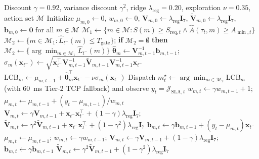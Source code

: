 \documentclass[10pt,journal,compsoc]{IEEEtran}
\begin{document}
\begin{algorithm}[!t]
\caption{CAPQ-Pareto Mean-Centered Russac D-LinUCB with Three-Tier Bounded SLA Gate}
\label{alg:bandit}
\begin{algorithmic}[1]
\Require Discount $\gamma=0.92$, variance discount $\gamma^2$, ridge $\lambda_{\mathrm{reg}}=0.20$, exploration $\nu=0.35$, action set $\mathcal{M}$
\State Initialize $\mu_{m,0} \leftarrow 0$, $w_{m,0} \leftarrow 0$, $\mathbf{V}_{m,0} \leftarrow \lambda_{\mathrm{reg}}\mathbf{I}_7$, $\widetilde{\mathbf{V}}_{m,0} \leftarrow \lambda_{\mathrm{reg}}\mathbf{I}_7$, $\mathbf{b}_{m,0} \leftarrow \mathbf{0}$ for all $m \in \mathcal{M}$
    \State $\mathcal{M}_1 \leftarrow \{m \in \mathcal{M} : S(m) \ge S_{\mathrm{req},t} \land \hat{A}(\tau_t, m) \ge A_{\min,t}\}$ 
    \State $\mathcal{M}_2 \leftarrow \{m \in \mathcal{M}_1 : \hat{L}_{t^-}(m) \le T_{\mathrm{gate}}\}$; \textbf{if} $\mathcal{M}_2 = \emptyset$ \textbf{then} $\mathcal{M}_2 \leftarrow \{\arg\min_{m \in \mathcal{M}_1} \hat{L}_{t^-}(m)\}$
        \State $\hat{\boldsymbol{\theta}}_m \leftarrow \mathbf{V}_{m,t-1}^{-1}\mathbf{b}_{m,t-1}$; \quad $\sigma_m(\mathbf{x}_{t^-}) \leftarrow \sqrt{\mathbf{x}_{t^-}^\top \mathbf{V}_{m,t-1}^{-1}\widetilde{\mathbf{V}}_{m,t-1}\mathbf{V}_{m,t-1}^{-1}\mathbf{x}_{t^-}}$
        \State $\mathrm{LCB}_m \leftarrow \mu_{m,t-1} + \hat{\boldsymbol{\theta}}_m^\top \mathbf{x}_{t^-} - \nu \sigma_m(\mathbf{x}_{t^-})$
    \EndFor
    \State Dispatch $m_t^\star \leftarrow \arg\min_{m \in \mathcal{M}_2} \mathrm{LCB}_m$ (with $60$~ms Tier-2 TCP fallback) and observe $y_t = \mathcal{J}_{\mathrm{SLA},t}$
            \State $w_{m,t} \leftarrow \gamma w_{m,t-1} + 1$; \quad $\mu_{m,t} \leftarrow \mu_{m,t-1} + (y_t - \mu_{m,t-1}) / w_{m,t}$
            \State $\mathbf{V}_{m,t} \leftarrow \gamma \mathbf{V}_{m,t-1} + \mathbf{x}_{t^-}\mathbf{x}_{t^-}^\top + (1-\gamma)\lambda_{\mathrm{reg}}\mathbf{I}_7$; \quad $\widetilde{\mathbf{V}}_{m,t} \leftarrow \gamma^2 \widetilde{\mathbf{V}}_{m,t-1} + \mathbf{x}_{t^-}\mathbf{x}_{t^-}^\top + (1-\gamma^2)\lambda_{\mathrm{reg}}\mathbf{I}_7$
            \State $\mathbf{b}_{m,t} \leftarrow \gamma \mathbf{b}_{m,t-1} + (y_t - \mu_{m,t})\mathbf{x}_{t^-}$
        \Else
            \State $\mu_{m,t} \leftarrow \mu_{m,t-1}$; \; $w_{m,t} \leftarrow \gamma w_{m,t-1}$; \; $\mathbf{V}_{m,t} \leftarrow \gamma \mathbf{V}_{m,t-1} + (1-\gamma)\lambda_{\mathrm{reg}}\mathbf{I}_7$; \; $\mathbf{b}_{m,t} \leftarrow \gamma \mathbf{b}_{m,t-1}$
            \State $\widetilde{\mathbf{V}}_{m,t} \leftarrow \gamma^2 \widetilde{\mathbf{V}}_{m,t-1} + (1-\gamma^2)\lambda_{\mathrm{reg}}\mathbf{I}_7$
        \EndIf
    \EndFor
\EndFor
\end{algorithmic}
\end{algorithm}
\end{document}
